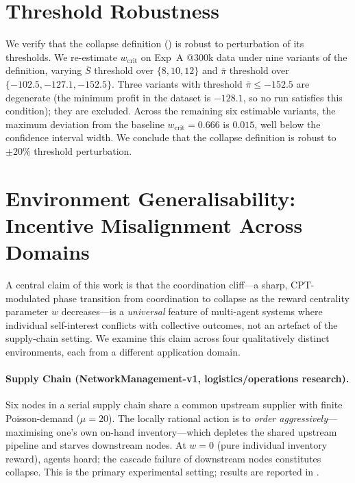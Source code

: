 \documentclass[11pt]{article}
\newcommand{\wcrit}{w_{\mathrm{crit}}}
\begin{document}
\appendix

\section{Threshold Robustness}
\label{sec:appendix_robustness}

We verify that the collapse definition () is robust to
perturbation of its thresholds.
We re-estimate $\wcrit$ on Exp~A @300k data under nine variants of the
definition, varying $\bar{S}$ threshold over $\{8, 10, 12\}$ and
$\bar{\pi}$ threshold over $\{-102.5, -127.1, -152.5\}$.
Three variants with threshold $\bar{\pi} \leq -152.5$ are degenerate
(the minimum profit in the dataset is $-128.1$, so no run satisfies
this condition); they are excluded.
Across the remaining six estimable variants, the maximum deviation from
the baseline $\wcrit = 0.666$ is $0.015$, well below the confidence
interval width.
We conclude that the collapse definition is robust to $\pm 20\%$ threshold
perturbation.

\section{Environment Generalisability: Incentive Misalignment Across Domains}
\label{sec:appendix_environments}

A central claim of this work is that the coordination cliff---a sharp, CPT-modulated
phase transition from coordination to collapse as the reward centrality parameter
$w$ decreases---is a \emph{universal} feature of multi-agent systems where individual
self-interest conflicts with collective outcomes, not an artefact of the supply-chain
setting.
We examine this claim across four qualitatively distinct environments, each from
a different application domain.

\paragraph{Supply Chain (NetworkManagement-v1, logistics/operations research).}
Six nodes in a serial supply chain share a common upstream supplier with
finite Poisson-demand ($\mu=20$).  The locally rational action is to
\emph{order aggressively}---maximising one's own on-hand inventory---which
depletes the shared upstream pipeline and starves downstream nodes.
At $w{=}0$ (pure individual inventory reward), agents hoard; the cascade failure
of downstream nodes constitutes collapse.
This is the primary experimental setting; results are reported in
.
\end{document}
